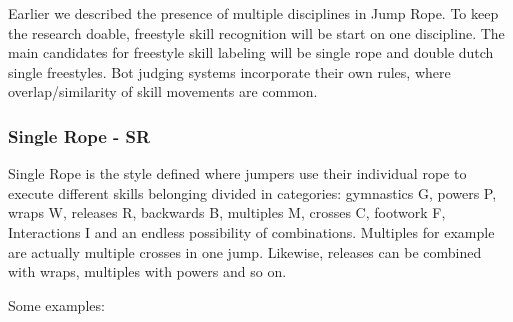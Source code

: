 
Earlier we described the presence of multiple disciplines in Jump Rope. To keep the research doable, freestyle skill recognition will be start on one discipline. The main candidates for freestyle skill labeling will be single rope and double dutch single freestyles. Bot judging systems incorporate their own rules, where overlap/similarity of skill movements are common. 

\subsubsection{Single Rope - SR}

Single Rope is the style defined where jumpers use their individual rope to execute different skills belonging divided in categories: gymnastics G, powers P, wraps W, releases R, backwards B, multiples M, crosses C, footwork F, Interactions I and an endless possibility of combinations. Multiples for example are actually multiple crosses in one jump. Likewise, releases can be combined with wraps, multiples with powers and so on.

Some examples:

